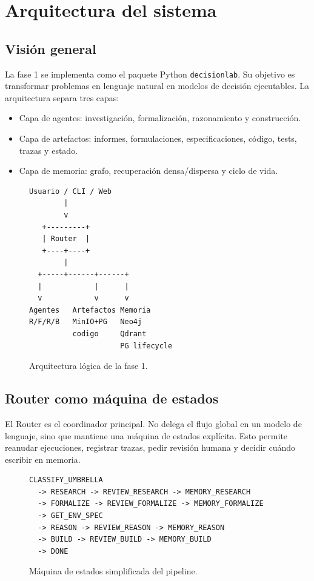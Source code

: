 \chapter{Arquitectura del sistema}

\section{Visión general}

La fase 1 se implementa como el paquete Python \texttt{decisionlab}. Su objetivo
es transformar problemas en lenguaje natural en modelos de decisión ejecutables.
La arquitectura separa tres capas:

\begin{itemize}
\item Capa de agentes: investigación, formalización, razonamiento y construcción.
\item Capa de artefactos: informes, formulaciones, especificaciones, código,
tests, trazas y estado.
\item Capa de memoria: grafo, recuperación densa/dispersa y ciclo de vida.
\end{itemize}

\begin{figure}[H]
\centering
\begin{verbatim}
Usuario / CLI / Web
        |
        v
   +---------+
   | Router  |
   +----+----+
        |
  +-----+------+------+
  |            |      |
  v            v      v
Agentes   Artefactos Memoria
R/F/R/B   MinIO+PG   Neo4j
          codigo     Qdrant
                     PG lifecycle
\end{verbatim}
\caption{Arquitectura lógica de la fase 1.}
\end{figure}

\section{Router como máquina de estados}

El Router es el coordinador principal. No delega el flujo global en un modelo de
lenguaje, sino que mantiene una máquina de estados explícita. Esto permite
reanudar ejecuciones, registrar trazas, pedir revisión humana y decidir cuándo
escribir en memoria.

\begin{figure}[H]
\centering
\begin{verbatim}
CLASSIFY_UMBRELLA
  -> RESEARCH -> REVIEW_RESEARCH -> MEMORY_RESEARCH
  -> FORMALIZE -> REVIEW_FORMALIZE -> MEMORY_FORMALIZE
  -> GET_ENV_SPEC
  -> REASON -> REVIEW_REASON -> MEMORY_REASON
  -> BUILD -> REVIEW_BUILD -> MEMORY_BUILD
  -> DONE
\end{verbatim}
\caption{Máquina de estados simplificada del pipeline.}
\end{figure}

